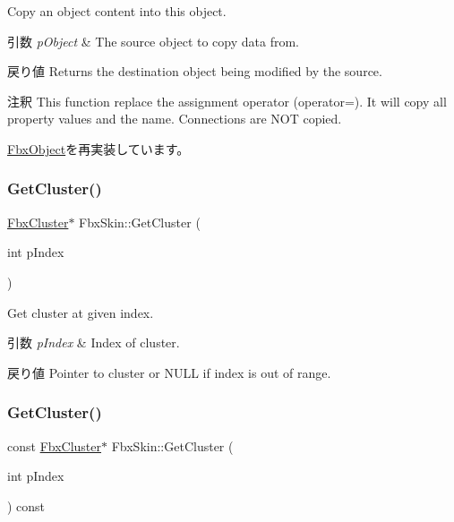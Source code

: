 Copy an object content into this object. 
\begin{DoxyParams}{引数}
{\em p\+Object} & The source object to copy data from. \\
\hline
\end{DoxyParams}
\begin{DoxyReturn}{戻り値}
Returns the destination object being modified by the source. 
\end{DoxyReturn}
\begin{DoxyRemark}{注釈}
This function replace the assignment operator (operator=). It will copy all property values and the name. Connections are N\+OT copied. 
\end{DoxyRemark}


\hyperlink{class_fbx_object_a0c0c5adb38284d14bb82c04d54504a3e}{Fbx\+Object}を再実装しています。

\mbox{\label{class_fbx_skin_a68f838f08f0760db6bcf8a64e478d2cf}} 
\subsubsection{\texorpdfstring{Get\+Cluster()}{GetCluster()}\hspace{0.1cm}{\footnotesize\ttfamily [1/2]}}
{\footnotesize\ttfamily \hyperlink{class_fbx_cluster}{Fbx\+Cluster}$\ast$ Fbx\+Skin\+::\+Get\+Cluster (\begin{DoxyParamCaption}\item[{int}]{p\+Index }\end{DoxyParamCaption})}

Get cluster at given index. 
\begin{DoxyParams}{引数}
{\em p\+Index} & Index of cluster. \\
\hline
\end{DoxyParams}
\begin{DoxyReturn}{戻り値}
Pointer to cluster or {\ttfamily N\+U\+LL} if index is out of range. 
\end{DoxyReturn}
\mbox{\label{class_fbx_skin_a12932e59ce0cf323f2a54d050aaa299e}} 
\subsubsection{\texorpdfstring{Get\+Cluster()}{GetCluster()}\hspace{0.1cm}{\footnotesize\ttfamily [2/2]}}
{\footnotesize\ttfamily const \hyperlink{class_fbx_cluster}{Fbx\+Cluster}$\ast$ Fbx\+Skin\+::\+Get\+Cluster (\begin{DoxyParamCaption}\item[{int}]{p\+Index }\end{DoxyParamCaption}) const}

